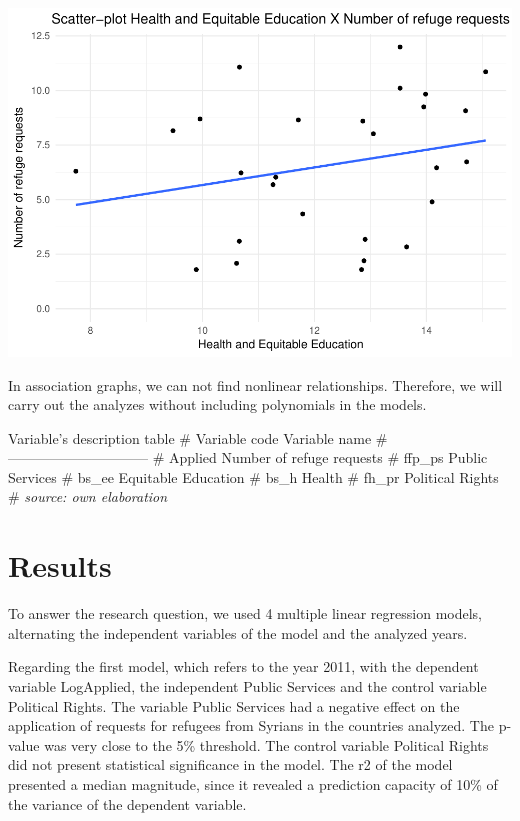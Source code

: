 \documentclass[]{elsarticle} %
\makeatletter
\def\maxwidth{\ifdim\Gin@nat@width>\linewidth\linewidth
\else\Gin@nat@width\fi}
\let\Oldincludegraphics\includegraphics
\renewcommand{\includegraphics}[1]{\Oldincludegraphics[width=\maxwidth]{#1}}
\makeatother
\begin{document}
\includegraphics{refugees-stephanie_files/figure-latex/model_1_4-1.pdf}

In association graphs, we can not find nonlinear relationships.
Therefore, we will carry out the analyzes without including polynomials
in the models.

Variable's description table \# \textbar{} Variable code \textbar{}
Variable name \textbar{} \#
\textbar{}---------------\textbar{}---------------\textbar{} \#
\textbar{} Applied \textbar{} Number of refuge requests \textbar{} \#
\textbar{} ffp\_ps \textbar{} Public Services \textbar{} \# \textbar{}
bs\_ee \textbar{} Equitable Education \textbar{} \# \textbar{} bs\_h
\textbar{} Health \textbar{} \# \textbar{} fh\_pr \textbar{} Political
Rights \textbar{} \# \emph{source: own elaboration}

\section{Results}\label{results}

To answer the research question, we used 4 multiple linear regression
models, alternating the independent variables of the model and the
analyzed years.

Regarding the first model, which refers to the year 2011, with the
dependent variable LogApplied, the independent Public Services and the
control variable Political Rights. The variable Public Services had a
negative effect on the application of requests for refugees from Syrians
in the countries analyzed. The p-value was very close to the 5\%
threshold. The control variable Political Rights did not present
statistical significance in the model. The r2 of the model presented a
median magnitude, since it revealed a prediction capacity of 10\% of the
variance of the dependent variable.
\end{document}
